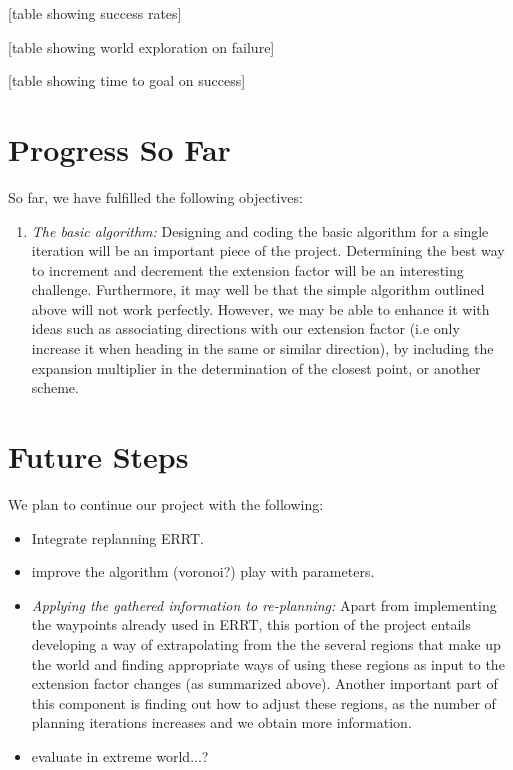 \documentclass[10pt,twoside,twocolumn]{article}
\begin{document}
[table showing success rates]

[table showing world exploration on failure]

[table showing time to goal on success]

\section{Progress So Far}

So far, we have fulfilled the following objectives:

\begin{enumerate}
\item {\it The basic algorithm:}  Designing and coding the basic algorithm for a single iteration will be an important piece of the project.  Determining the best way to increment and decrement the extension factor will be an interesting challenge.  Furthermore, it may well be that the simple algorithm outlined above will not work perfectly.  However, we may be able to enhance it with ideas such as associating directions with our extension factor (i.e only increase it when heading in the same or similar direction), by including the expansion multiplier in the determination of the closest point, or another scheme.

\end{enumerate}


\section{Future Steps}

We plan to continue our project with the following:
\begin{itemize}
\item Integrate replanning ERRT.
\item improve the algorithm (voronoi?) play with parameters.
\item {\it Applying the gathered information to re-planning:} Apart from implementing the waypoints already used in ERRT, this portion of the project entails developing a way of extrapolating from the the several regions that make up the world and finding appropriate ways of using these regions as input to the extension factor changes (as summarized above). Another important part of this component is finding out how to adjust these regions, as the number of planning iterations increases and we obtain more information.
\item evaluate in extreme world...?
\end{itemize}

{}

\end{document}
